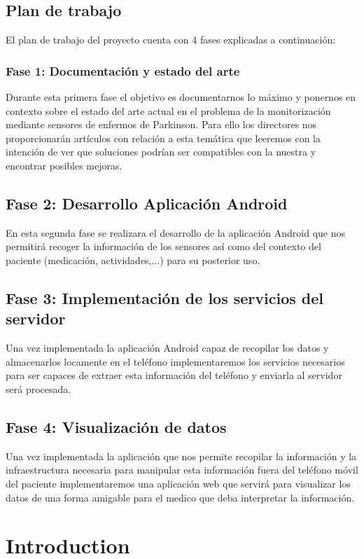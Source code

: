 \subsection{Plan de trabajo}
El plan de trabajo del proyecto cuenta con 4 fases explicadas a continuación:

\subsubsection{Fase 1: Documentación y estado del arte}
Durante esta primera fase el objetivo es documentarnos lo máximo y ponernos en contexto sobre el estado del arte actual en el problema de la monitorización mediante sensores de enfermos de Parkinson. Para ello los directores nos proporcionarán artículos con relación a esta temática que leeremos con la intención de ver que soluciones podrían ser compatibles con la nuestra y encontrar posibles mejoras.

\subsection{Fase 2: Desarrollo Aplicación Android}
En esta segunda fase se realizara el desarrollo de la aplicación Android que nos permitirá recoger la información de los sensores así como del contexto del paciente (medicación, actividades,...) para su posterior uso.

\subsection{Fase 3: Implementación de los servicios del servidor}
Una vez implementada la aplicación Android capaz de recopilar los datos y almacenarlos locamente en el teléfono implementaremos los servicios necesarios para ser capaces de extraer esta información del teléfono y enviarla al servidor será procesada.

\subsection{Fase 4: Visualización de datos}
Una vez implementada la aplicación que nos permite recopilar la información y la infraestructura necesaria para manipular esta información fuera del teléfono móvil del paciente implementaremos una aplicación web que servirá para visualizar los datos de una forma amigable para el medico que deba interpretar la información.

\newpage

\section{Introduction}

